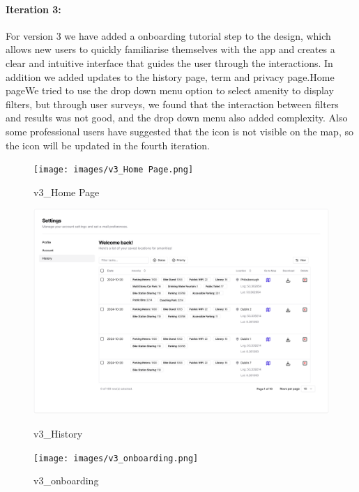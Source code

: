 \paragraph{Iteration 3:}
For version 3 we have added a onboarding tutorial step to the design, which allows new users to quickly familiarise themselves with the app and creates a clear and intuitive interface that guides the user through the interactions. In addition we added updates to the history page, term and privacy page.Home pageWe tried to use the drop down menu option to select amenity to display filters, but through user surveys, we found that the interaction between filters and results was not good, and the drop down menu also added complexity. Also some professional users have suggested that the icon is not visible on the map, so the icon will be updated in the fourth iteration.
\begin{figure}[h]
    \centering
    \begin{minipage}{0.32\textwidth}
        \centering
        \texttt{[image: images/v3\_Home Page.png]}
        \caption{v3\_Home Page}
        \label{fig:v3_Home Page}
    \end{minipage}
    \hfill
    \begin{minipage}{0.32\textwidth}
        \centering
        \includegraphics[width=\textwidth]{images/v3_History.png}
        \caption{v3\_History}
        \label{fig:v3_History}
    \end{minipage}
    \hfill
    \begin{minipage}{0.32\textwidth}
        \centering
        \texttt{[image: images/v3\_onboarding.png]}
        \caption{v3\_onboarding}
        \label{fig:v3_onboarding}
    \end{minipage}

\end{figure}



